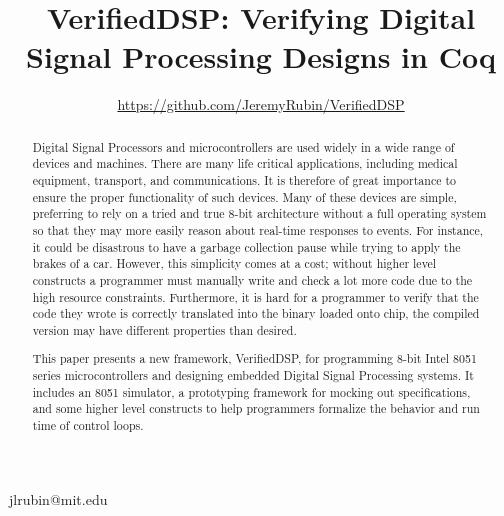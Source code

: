 \documentclass[preprint,12pt]{sigplanconf}
\begin{document}
\setlength{\pdfpageheight}{\paperheight}
\setlength{\pdfpagewidth}{\paperwidth}




\title{VerifiedDSP: Verifying Digital Signal Processing Designs in Coq}
\subtitle{\url{https://github.com/JeremyRubin/VerifiedDSP}}

 {jlrubin@mit.edu}

\maketitle

\begin{abstract}
  Digital Signal Processors and microcontrollers are used widely in a
wide range of devices and machines.  There are many life critical
applications, including medical equipment, transport, and
communications. It is therefore of great importance to ensure the
proper functionality of such devices. Many of these devices are
simple, preferring to rely on a tried and true 8-bit architecture
without a full operating system so that they may more easily reason
about real-time responses to events. For instance, it could be
disastrous to have a garbage collection pause while trying to apply
the brakes of a car. However, this simplicity comes at a cost; without
higher level constructs a programmer must manually write and check a
lot more code due to the high resource constraints. Furthermore, it is
hard for a programmer to verify that the code they wrote is correctly
translated into the binary loaded onto chip, the compiled version may
have different properties than desired.


   This paper presents a new framework, VerifiedDSP, for programming
8-bit Intel 8051 series microcontrollers and designing embedded
Digital Signal Processing systems. It includes an 8051 simulator, a
prototyping framework for mocking out specifications, and some higher
level constructs to help programmers formalize the behavior and run
time of control loops.
\end{abstract}
\end{document}
